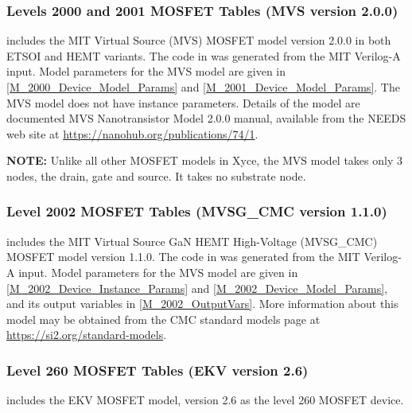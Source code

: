 








\clearpage
\subsubsection{Levels 2000 and 2001 MOSFET Tables (MVS version 2.0.0)}
\Xyce{} includes the MIT Virtual Source (MVS) MOSFET model version
2.0.0 in both ETSOI and HEMT variants.  The code in \Xyce{} was
generated from the MIT Verilog-A input.  Model parameters for the MVS
model are given in \ref{M_2000_Device_Model_Params} and
\ref{M_2001_Device_Model_Params}.  The MVS model does not have
instance parameters.  Details of the model are documented MVS
Nanotransistor Model 2.0.0 manual, available from the NEEDS web site
at \url{https://nanohub.org/publications/74/1}.

{\bf NOTE: } Unlike all other MOSFET models in Xyce, the MVS model
takes only 3 nodes, the drain, gate and source.  It takes no substrate
node.




\clearpage

\subsubsection{Level 2002 MOSFET Tables (MVSG\_CMC version 1.1.0)}
\Xyce{} includes the MIT Virtual Source GaN HEMT High-Voltage
(MVSG\_CMC) MOSFET model version 1.1.0.  The code in \Xyce{} was
generated from the MIT Verilog-A input.  Model parameters for the MVS
model are given in \ref{M_2002_Device_Instance_Params} and
\ref{M_2002_Device_Model_Params}, and its output variables in
\ref{M_2002_OutputVars}.  More information about this model may be
obtained from the CMC standard models page at
\url{https://si2.org/standard-models}.






\clearpage
\subsubsection{Level 260 MOSFET Tables (EKV version 2.6)}

\Xyce{} includes the EKV MOSFET model, version 2.6 as the level 260
MOSFET device.

